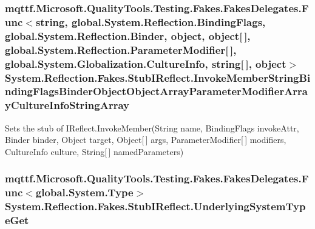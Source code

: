 \hypertarget{class_system_1_1_reflection_1_1_fakes_1_1_stub_i_reflect_a824c377fc6c890dfaebbc577f6ec1438}{
\subsubsection[{Invoke\-Member\-String\-Binding\-Flags\-Binder\-Object\-Object\-Array\-Parameter\-Modifier\-Array\-Culture\-Info\-String\-Array}]{\setlength{\rightskip}{0pt plus 5cm}mqttf.\-Microsoft.\-Quality\-Tools.\-Testing.\-Fakes.\-Fakes\-Delegates.\-Func$<$string, global.\-System.\-Reflection.\-Binding\-Flags, global.\-System.\-Reflection.\-Binder, object, object\mbox{[}$\,$\mbox{]}, global.\-System.\-Reflection.\-Parameter\-Modifier\mbox{[}$\,$\mbox{]}, global.\-System.\-Globalization.\-Culture\-Info, string\mbox{[}$\,$\mbox{]}, object$>$ System.\-Reflection.\-Fakes.\-Stub\-I\-Reflect.\-Invoke\-Member\-String\-Binding\-Flags\-Binder\-Object\-Object\-Array\-Parameter\-Modifier\-Array\-Culture\-Info\-String\-Array}}\label{class_system_1_1_reflection_1_1_fakes_1_1_stub_i_reflect_a824c377fc6c890dfaebbc577f6ec1438}


Sets the stub of I\-Reflect.\-Invoke\-Member(\-String name, Binding\-Flags invoke\-Attr, Binder binder, Object target, Object\mbox{[}$\,$\mbox{]} args, Parameter\-Modifier\mbox{[}$\,$\mbox{]} modifiers, Culture\-Info culture, String\mbox{[}$\,$\mbox{]} named\-Parameters)

\hypertarget{class_system_1_1_reflection_1_1_fakes_1_1_stub_i_reflect_aebc45abe6f4759bfc0bf640253c81884}{
\subsubsection[{Underlying\-System\-Type\-Get}]{\setlength{\rightskip}{0pt plus 5cm}mqttf.\-Microsoft.\-Quality\-Tools.\-Testing.\-Fakes.\-Fakes\-Delegates.\-Func$<$global.\-System.\-Type$>$ System.\-Reflection.\-Fakes.\-Stub\-I\-Reflect.\-Underlying\-System\-Type\-Get}}\label{class_system_1_1_reflection_1_1_fakes_1_1_stub_i_reflect_aebc45abe6f4759bfc0bf640253c81884}


